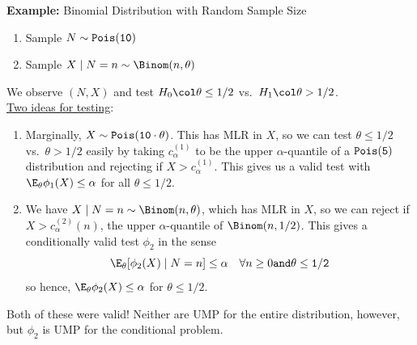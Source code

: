 \begin{example}{\textbf{Example:} Binomial Distribution with Random Sample Size}
    \begin{enumerate}
        \item Sample $N \sim \tt{Pois}(10)$
        \item Sample $X \mid N = n \sim \Binom(n, \theta)$
    \end{enumerate}
    We observe $(N, X)$ and test $H_0 \col \theta \leq 1/2$ vs.\ $H_1 \col \theta > 1/2$.\\

    \underline{Two ideas for testing}:
    \begin{enumerate}
        \item Marginally, $X \sim \tt{Pois}(10 \cdot \theta)$. This has MLR in $X$, so we can test $\theta \leq 1/2$ vs.\ $\theta > 1/2$ easily by taking $c_{\alpha}^{(1)}$ to be the upper $\alpha$-quantile of a $\tt{Pois}(5)$ distribution and rejecting if $X > c_{\alpha}^{(1)}$. This gives us a valid test with $\E_{\theta}\phi_1(X) \leq \alpha$ for all $\theta \leq 1/2$.
        \item We have $X \mid N = n \sim \Binom(n, \theta)$, which has MLR in $X$, so we can reject if $X > c_{\alpha}^{(2)}(n)$, the upper $\alpha$-quantile of $\Binom(n, 1/2)$. This gives a conditionally valid test $\phi_2$ in the sense
        \[ \E_{\theta}[\phi_2(X) \mid N = n] \leq \alpha \quad \forall n \geq 0 \tt{ and } \theta \leq 1/2 \]
        so hence, $\E_{\theta}\phi_2(X) \leq \alpha$ for $\theta \leq 1/2$.
    \end{enumerate}
    Both of these were valid! Neither are UMP for the entire distribution, however, but $\phi_2$ is UMP for the conditional problem.
\end{example}

